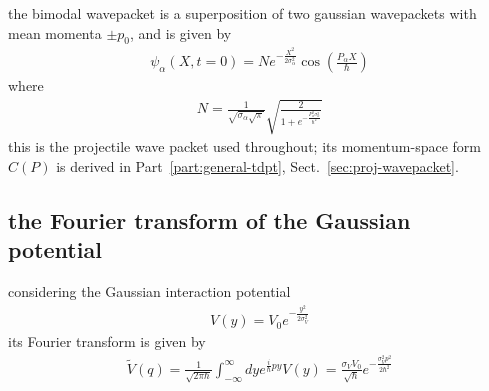 the bimodal wavepacket is a superposition of two gaussian wavepackets with mean momenta $\pm p_0$, and is given by
\begin{align}
    \psi_\alpha(X,t=0) = N e^{-\frac{X^2}{2\sigma_\alpha^2}}\cos\left(\frac{P_\alpha X}{\hbar}\right)
\end{align}
where
\begin{align}
    N = \frac1{\sqrt{\sigma_\alpha\sqrt{\pi}}}\sqrt{\frac{2}{1+e^{-\frac{P_\alpha^2\sigma_\alpha^2}{\hbar^2}}}}
\end{align}
this is the projectile wave packet used throughout; its momentum-space form $C(P)$ is derived in Part~\ref{part:general-tdpt}, Sect.~\ref{sec:proj-wavepacket}.

\subsection{the Fourier transform of the Gaussian potential}

considering the Gaussian interaction potential
\begin{align}
    V(y) = V_0 e^{-\frac{y^2}{2\sigma_V^2}}
\end{align}
its Fourier transform is given by
\begin{align}
    \tilde V(q) = \frac{1}{\sqrt{2\pi\hbar}}\int_{-\infty}^\infty dy e^{\frac{i}{\hbar}py}V(y)=
    \frac{\sigma_V V_0}{\sqrt{\hbar}}e^{-\frac{\sigma_V^2 p^2}{2\hbar^2}}
\end{align}
